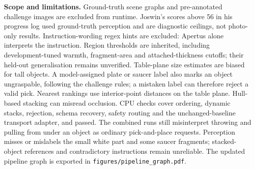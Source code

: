 \documentclass[10pt,a4paper]{article}
\begin{document}
\textbf{Scope and limitations.} Ground-truth scene graphs and pre-annotated challenge images
are excluded from runtime. Joswin's scores above 56 in his progress log used ground-truth
perception and are diagnostic ceilings, not photo-only results. Instruction-wording regex hints
are excluded: Apertus alone interprets the instruction. Region thresholds are inherited,
including development-tuned warmth, fragment-area and attached-thickness cutoffs; their
held-out generalisation remains unverified. Table-plane size estimates are biased for tall
objects. A model-assigned plate or saucer label also marks an object ungraspable, following the
challenge rules; a mistaken label can therefore reject a valid pick. Nearest rankings use
interior-point distances on the table plane. Hull-based stacking can misread occlusion. CPU checks cover ordering, dynamic stacks, rejection,
schema recovery, safety routing and the unchanged-baseline transport adapter, and passed.
The combined runs still misinterpret throwing and pulling from under an object as ordinary
pick-and-place requests. Perception misses or mislabels the small white part and some saucer
fragments; stacked-object references and contradictory instructions remain unreliable.
The updated pipeline graph is exported in \texttt{figures/pipeline\_graph.pdf}.
\end{document}
